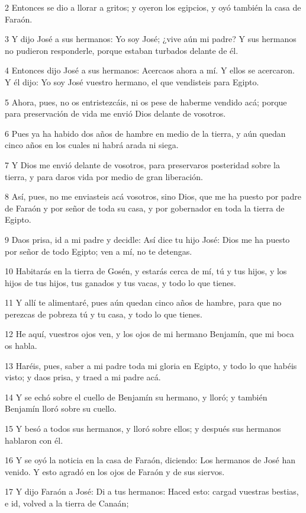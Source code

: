 2 Entonces se dio a llorar a gritos; y oyeron los egipcios, y oyó también la casa de Faraón.

3 Y dijo José a sus hermanos: Yo soy José; ¿vive aún mi padre? Y sus hermanos no pudieron responderle, porque estaban turbados delante de él.

4 Entonces dijo José a sus hermanos: Acercaos ahora a mí. Y ellos se acercaron. Y él dijo: Yo soy José vuestro hermano, el que vendisteis para Egipto.

5 Ahora, pues, no os entristezcáis, ni os pese de haberme vendido acá; porque para preservación de vida me envió Dios delante de vosotros.

6 Pues ya ha habido dos años de hambre en medio de la tierra, y aún quedan cinco años en los cuales ni habrá arada ni siega.

7 Y Dios me envió delante de vosotros, para preservaros posteridad sobre la tierra, y para daros vida por medio de gran liberación.

8 Así, pues, no me enviasteis acá vosotros, sino Dios, que me ha puesto por padre de Faraón y por señor de toda su casa, y por gobernador en toda la tierra de Egipto.

9 Daos prisa, id a mi padre y decidle: Así dice tu hijo José: Dios me ha puesto por señor de todo Egipto; ven a mí, no te detengas.

10 Habitarás en la tierra de Gosén, y estarás cerca de mí, tú y tus hijos, y los hijos de tus hijos, tus ganados y tus vacas, y todo lo que tienes.

11 Y allí te alimentaré, pues aún quedan cinco años de hambre, para que no perezcas de pobreza tú y tu casa, y todo lo que tienes.

12 He aquí, vuestros ojos ven, y los ojos de mi hermano Benjamín, que mi boca os habla.

13 Haréis, pues, saber a mi padre toda mi gloria en Egipto, y todo lo que habéis visto; y daos prisa, y traed a mi padre acá.

14 Y se echó sobre el cuello de Benjamín su hermano, y lloró; y también Benjamín lloró sobre su cuello.

15 Y besó a todos sus hermanos, y lloró sobre ellos; y después sus hermanos hablaron con él.

16 Y se oyó la noticia en la casa de Faraón, diciendo: Los hermanos de José han venido. Y esto agradó en los ojos de Faraón y de sus siervos.

17 Y dijo Faraón a José: Di a tus hermanos: Haced esto: cargad vuestras bestias, e id, volved a la tierra de Canaán;

